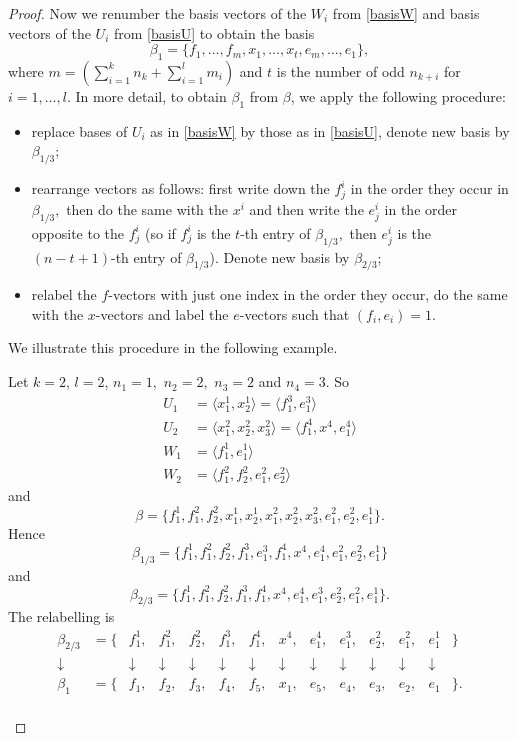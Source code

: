 \begin{proof}
Now we renumber the basis vectors of the $W_i$ from \eqref{basisW} and basis vectors of the $U_i$ from \eqref{basisU} to obtain the basis 
$$\beta_1=\{f_1, \ldots, f_m, x_1, \ldots, x_t, e_m, \ldots, e_1\},$$
where $m=\left( \sum_{i=1}^{k}n_k +\sum_{i=1}^l m_{i} \right)$ and $t$ is the number of odd $n_{k+i}$ for $i=1, \ldots, l.$ In more detail, to obtain $\beta_1$ from $\beta$, we apply the following procedure:
\begin{itemize}
\item  replace bases of $U_i$ as in \eqref{basisW} by those as in \eqref{basisU}, denote new basis by $\beta_{1/3}$;
\item rearrange vectors as follows: first write down the $f^i_j$ in the order they occur in $\beta_{1/3},$ then do the same with the $x^i$ and then write the $e^i_j$ in the order opposite to the $f^i_j$ (so if $f^i_j$ is the $t$-th entry of $\beta_{1/3},$ then $e^i_j$ is the $(n-t+1)$-th entry of $\beta_{1/3}$). Denote new basis by $\beta_{2/3}$;
\item relabel the $f$-vectors with just one index in the order they occur, do the same with the $x$-vectors and label  the  $e$-vectors such that $(f_i,e_i)=1.$
\end{itemize}
We illustrate this procedure in the following example. 
\begin{example}
Let $k=2$, $l=2$, $n_1=1,$ $n_2=2,$ $n_3=2$ and $n_4=3.$ So
\begin{equation*}
\begin{split}
U_1& = \langle x_1^1, x_2^1 \rangle= \langle f_1^3, e_1^3 \rangle\\
U_2& = \langle x_1^2, x_2^2,x_3^2 \rangle= \langle f_1^4, x^4, e_1^4 \rangle \\
W_1& = \langle f_1^1, e_1^1 \rangle \\
W_2& = \langle f_1^2, f_2^2, e_1^2, e_2^2 \rangle
\end{split}
\end{equation*}
and $$\beta=\{f_1^1, f_1^2, f_2^2, x_1^1, x_2^1, x_1^2, x_2^2, x_3^2, e_1^2,e_2^2,e_1^1\}.$$ Hence 
$$\beta_{1/3}=\{f_1^1, f_1^2, f_2^2, f_1^3, e_1^3, f_1^4, x^4, e_1^4, e_1^2,e_2^2,e_1^1\}$$
and 
$$\beta_{2/3}=\{f_1^1, f_1^2, f_2^2, f_1^3, f_1^4, x^4,  e_1^4, e_1^3, e_2^2, e_1^2, e_1^1\}.$$ The relabelling is 
\begin{equation}
\begin{array}{cccccccccccccc}
{\beta_{2/3}}&= \{& f_1^1,& f_1^2,& f_2^2,& f_1^3,& f_1^4,& x^4,&  e_1^4,& e_1^3,& e_2^2,& e_1^2,& e_1^1&\}\\
\downarrow& & \downarrow&\downarrow&\downarrow&\downarrow&\downarrow&\downarrow&\downarrow&\downarrow&\downarrow&\downarrow&\downarrow& \\
\beta_{1}&= \{& f_1,& f_2,& f_3,& f_4,& f_5,& x_1,&  e_5,& e_4,& e_3,& e_2,& e_1&\}.\\
\end{array}
\end{equation}
\end{example}


\end{proof}
